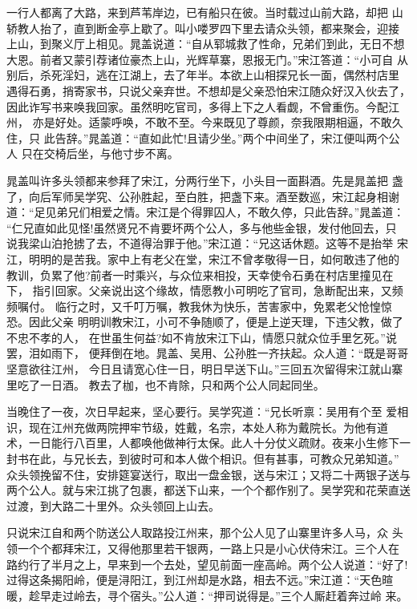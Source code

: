 一行人都离了大路，来到芦苇岸边，已有船只在彼。当时载过山前大路，却把
山轿教人抬了，直到断金亭上歇了。叫小喽罗四下里去请众头领，都来聚会，迎接
上山，到聚义厅上相见。晁盖说道：“自从郓城救了性命，兄弟们到此，无日不想
大恩。前者又蒙引荐诸位豪杰上山，光辉草寨，恩报无门。”宋江答道：“小可自
从别后，杀死淫妇，逃在江湖上，去了年半。本欲上山相探兄长一面，偶然村店里
遇得石勇，捎寄家书，只说父亲弃世。不想却是父亲恐怕宋江随众好汉入伙去了，
因此诈写书来唤我回家。虽然明吃官司，多得上下之人看觑，不曾重伤。今配江州，
亦是好处。适蒙呼唤，不敢不至。今来既见了尊颜，奈我限期相逼，不敢久住，只
此告辞。”晁盖道：“直如此忙!且请少坐。”两个中间坐了，宋江便叫两个公人
只在交椅后坐，与他寸步不离。

晁盖叫许多头领都来参拜了宋江，分两行坐下，小头目一面斟酒。先是晁盖把
盏了，向后军师吴学究、公孙胜起，至白胜，把盏下来。酒至数巡，宋江起身相谢
道：“足见弟兄们相爱之情。宋江是个得罪囚人，不敢久停，只此告辞。”晁盖道：
“仁兄直如此见怪!虽然贤兄不肯要坏两个公人，多与他些金银，发付他回去，只
说我梁山泊抢掳了去，不道得治罪于他。”宋江道：“兄这话休题。这等不是抬举
宋江，明明的是苦我。家中上有老父在堂，宋江不曾孝敬得一日，如何敢违了他的
教训，负累了他?前者一时乘兴，与众位来相投，天幸使令石勇在村店里撞见在下，
指引回家。父亲说出这个缘故，情愿教小可明吃了官司，急断配出来，又频频嘱付。
临行之时，又千叮万嘱，教我休为快乐，苦害家中，免累老父怆惶惊恐。因此父亲
明明训教宋江，小可不争随顺了，便是上逆天理，下违父教，做了不忠不孝的人，
在世虽生何益?如不肯放宋江下山，情愿只就众位手里乞死。”说罢，泪如雨下，
便拜倒在地。晁盖、吴用、公孙胜一齐扶起。众人道：“既是哥哥坚意欲往江州，
今日且请宽心住一日，明日早送下山。”三回五次留得宋江就山寨里吃了一日酒。
教去了枷，也不肯除，只和两个公人同起同坐。

当晚住了一夜，次日早起来，坚心要行。吴学究道：“兄长听禀：吴用有个至
爱相识，现在江州充做两院押牢节级，姓戴，名宗，本处人称为戴院长。为他有道
术，一日能行八百里，人都唤他做神行太保。此人十分仗义疏财。夜来小生修下一
封书在此，与兄长去，到彼时可和本人做个相识。但有甚事，可教众兄弟知道。”
众头领挽留不住，安排筵宴送行，取出一盘金银，送与宋江；又将二十两银子送与
两个公人。就与宋江挑了包裹，都送下山来，一个个都作别了。吴学究和花荣直送
过渡，到大路二十里外。众头领回上山去。

只说宋江自和两个防送公人取路投江州来，那个公人见了山寨里许多人马，众
头领一个个都拜宋江，又得他那里若干银两，一路上只是小心伏侍宋江。三个人在
路约行了半月之上，早来到一个去处，望见前面一座高岭。两个公人说道：“好了!
过得这条揭阳岭，便是浔阳江，到江州却是水路，相去不远。”宋江道：“天色暄
暖，趁早走过岭去，寻个宿头。”公人道：“押司说得是。”三个人厮赶着奔过岭
来。

